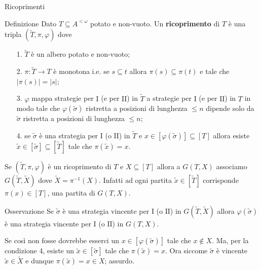 \documentclass[aspectratio=43]{beamer}
\begin{document}
\begin{frame}{Ricoprimenti}
  \begin{block}{Definizione}
    Dato \(T \subseteq A^{<\omega}\) potato e non-vuoto.
    Un \textbf{ricoprimento} di \(T\) è una tripla \((\tilde{T}, \pi, \varphi)\) dove
    \begin{itemize}
    \item[1.] \(\tilde{T}\) è un albero potato e non-vuoto;
    \item[2.] \(\pi:\tilde{T} \to T\) è monotona i.e. se \(s \subseteq t\) allora \(\pi(s) \subseteq \pi(t)\) e  tale che \(|\pi(s)| = |s|\);
    \item[3.] \(\varphi\) mappa strategie per \(\mathrm{I}\) (e per \(\mathrm{II}\)) in \(\tilde{T}\) a strategie per \(\mathrm{I}\) (e per \(\mathrm{II}\)) in \(T\) in modo tale che \(\varphi(\tilde{\sigma})\) ristretta a posizioni di lunghezza \(\leq n\) dipende solo da \(\tilde{\sigma}\) ristretta a posizioni di lunghezza \(\leq n\);
    \item[4.] se \(\tilde{\sigma}\) è una strategia per \(\mathrm{I}\) (o \(\mathrm{II}\)) in \(\tilde{T}\) e \(x \in [\varphi(\tilde{\sigma})] \subseteq [T]\) allora esiste \(\tilde{x} \in [\tilde{\sigma}] \subseteq [\tilde{T}]\) tale che \(\pi(\tilde{x}) = x\).
    \end{itemize}
  \end{block}
\end{frame}

\begin{frame}
  \begin{block}{}
    Se \((\tilde{T}, \pi, \varphi)\) è un ricoprimento di \(T\) e \(X \subseteq [T]\) allora a \(G(T, X)\) associamo \(G(\tilde{T}, \tilde{X})\) dove \(\tilde{X} = \pi^{-1}(X)\).
    Infatti ad ogni partita \(\tilde{x} \in [\tilde{T}]\) corrisponde \(\pi(x) \in [T]\), una partita di \(G(T, X)\).
  \end{block}
  \pause
  \begin{block}{Osservazione}
    Se \(\tilde{\sigma}\) è una strategia vincente per \(\mathrm{I}\) (o \(\mathrm{II}\)) in \(G(\tilde{T}, \tilde{X})\) allora \(\varphi(\tilde{\sigma})\) è una strategia vincente per \(\mathrm{I}\) (o \(\mathrm{II}\)) in \(G(T, X)\).
  \end{block}
  \pause
  \begin{block}{}
    Se così non fosse dovrebbe esserci un \(x \in [\varphi(\tilde{\sigma})]\) tale che \(x \not\in X\).
    Ma, per la condizione 4, esiste un \(\tilde{x} \in [\tilde{\sigma}]\) tale che \(\pi(\tilde{x}) = x\).
    Ora siccome \(\tilde{\sigma}\) è vincente \(\tilde{x} \in \tilde{X}\) e dunque \(\pi(\tilde{x}) = x \in X\); assurdo.
  \end{block}
\end{frame}
\end{document}

